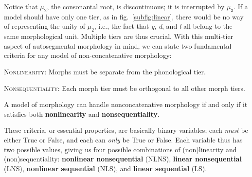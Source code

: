 Notice that $\mu_2$, the consonantal root, is discontinuous; it is
interrupted by $\mu_3$. If a model should have only one tier, as in
fig.~\ref{subfig:linear}, there would be no way of representing the
unity of $\mu_2$, i.e., the fact that \textit{g}, \textit{d}, and \textit{l}
all belong to the same morphological unit. Multiple tiers are thus crucial. With this multi-tier aspect of
autosegmental morphology in mind, we can state two fundamental criteria for any
model of non-concatenative morphology:

	\begin{definition}\label{def:nl}{\textsc{Nonlinearity}}: %
	Morphs must be separate from the phonological tier. \end{definition}
	\begin{definition}\label{def:ns}{\textsc{Nonsequentiality}}: %
	Each morph tier must be orthogonal to all other morph tiers.
	\end{definition}
\begin{proposition}\label{prop:nlns}
A model of morphology can handle nonconcatenative morphology if and only if it satisfies both \textbf{nonlinearity} and \textbf{nonsequentiality}. %
\end{proposition}
These criteria, or essential properties,
are basically binary variables; each \emph{must} be either True or False, and each can \emph{only} be True or False.  Each variable thus has two possible values,
giving us four possible combinations of (non)linearity and (non)sequentiality: 
\textbf{nonlinear nonsequential} (NLNS), \textbf{linear nonsequential} (LNS), 
\textbf{nonlinear sequential} (NLS), and \textbf{linear sequential} (LS).

